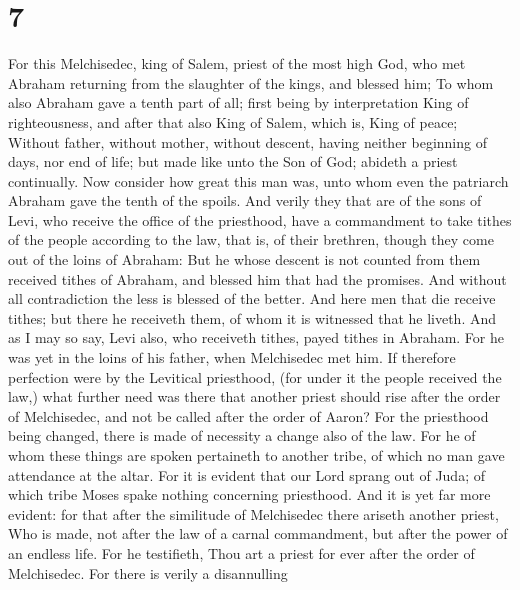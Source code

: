 \hypertarget{section-6}{%
\section{7}\label{section-6}}

 For this Melchisedec, king of Salem, priest of the most
high God, who met Abraham returning from the slaughter of the kings, and
blessed him;  To whom also Abraham gave a tenth part of all;
first being by interpretation King of righteousness, and after that also
King of Salem, which is, King of peace;  Without father,
without mother, without descent, having neither beginning of days, nor
end of life; but made like unto the Son of God; abideth a priest
continually.  Now consider how great this man was, unto whom
even the patriarch Abraham gave the tenth of the spoils. 
And verily they that are of the sons of Levi, who receive the office of
the priesthood, have a commandment to take tithes of the people
according to the law, that is, of their brethren, though they come out
of the loins of Abraham:  But he whose descent is not
counted from them received tithes of Abraham, and blessed him that had
the promises.  And without all contradiction the less is
blessed of the better.  And here men that die receive
tithes; but there he receiveth them, of whom it is witnessed that he
liveth.  And as I may so say, Levi also, who receiveth
tithes, payed tithes in Abraham.  For he was yet in the
loins of his father, when Melchisedec met him.  If
therefore perfection were by the Levitical priesthood, (for under it the
people received the law,) what further need was there that another
priest should rise after the order of Melchisedec, and not be called
after the order of Aaron?  For the priesthood being
changed, there is made of necessity a change also of the law.
 For he of whom these things are spoken pertaineth to
another tribe, of which no man gave attendance at the altar.
 For it is evident that our Lord sprang out of Juda; of
which tribe Moses spake nothing concerning priesthood.  And
it is yet far more evident: for that after the similitude of Melchisedec
there ariseth another priest,  Who is made, not after the
law of a carnal commandment, but after the power of an endless life.
 For he testifieth, Thou art a priest for ever after the
order of Melchisedec.  For there is verily a disannulling
